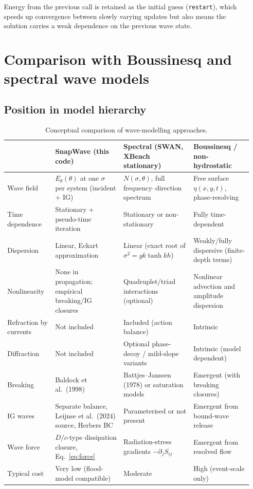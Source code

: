 \documentclass[11pt,a4paper]{article}
\newcommand{\ee}{E_\theta}
\newcommand{\code}[1]{\texttt{#1}}
\begin{document}
Energy from the previous call is retained as the initial guess (\code{restart}),
which speeds up convergence between slowly varying updates but also means the
solution carries a weak dependence on the previous wave state.


\section{Comparison with Boussinesq and spectral wave models}
\label{sec:comparison}

\subsection{Position in model hierarchy}

\begin{table}[h!]
\centering
\small
\caption{Conceptual comparison of wave-modelling approaches.}
\label{tab:comparison}
\begin{tabular}{@{}p{2.8cm}p{3.9cm}p{4.0cm}p{3.6cm}@{}}
\toprule
 & \textbf{SnapWave (this code)} & \textbf{Spectral (SWAN, XBeach stationary)} & \textbf{Boussinesq / non-hydrostatic} \\
\midrule
Wave field & $\ee(\theta)$ at one $\sigma$ per system (incident + IG) & $N(\sigma,\theta)$, full frequency--direction spectrum & Free surface $\eta(x,y,t)$, phase-resolving \\
Time dependence & Stationary + pseudo-time iteration & Stationary or non-stationary & Fully time-dependent \\
Dispersion & Linear, Eckart approximation & Linear (exact root of $\sigma^2=gk\tanh kh$) & Weakly/fully dispersive (finite-depth terms) \\
Nonlinearity & None in propagation; empirical breaking/IG closures & Quadruplet/triad interactions (optional) & Nonlinear advection and amplitude dispersion \\
Refraction by currents & Not included & Included (action balance) & Intrinsic \\
Diffraction & Not included & Optional phase-decoy / mild-slope variants & Intrinsic (model dependent) \\
Breaking & Baldock et al.\ (1998) & Battjes--Janssen (1978) or saturation models & Emergent (with breaking closures) \\
IG waves & Separate balance, Leijnse et al.\ (2024) source, Herbers BC & Parameterised or not present & Emergent from bound-wave release \\
Wave force & $D/c$-type dissipation closure, Eq.~\eqref{eq:force} & Radiation-stress gradients $-\partial_j S_{ij}$ & Emergent from resolved flow \\
Typical cost & Very low (flood-model compatible) & Moderate & High (event-scale only) \\
\bottomrule
\end{tabular}
\end{table}
\end{document}
